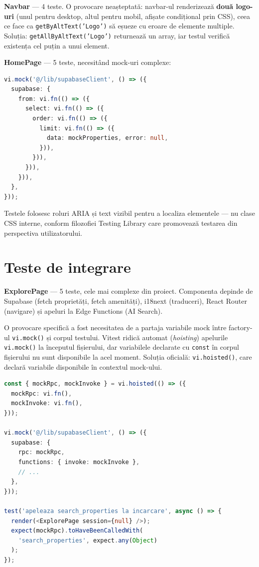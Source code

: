 \documentclass[12pt,a4paper,oneside]{report}
\begin{document}
\textbf{Navbar} — 4 teste. O provocare neașteptată: navbar-ul renderizează \textbf{două logo-uri} (unul pentru desktop, altul pentru mobil, afișate condițional prin CSS), ceea ce face ca \texttt{getByAltText('Logo')} să eșueze cu eroare de elemente multiple. Soluția: \texttt{getAllByAltText('Logo')} returnează un array, iar testul verifică existența cel puțin a unui element.

\textbf{HomePage} — 5 teste, necesitând mock-uri complexe:

\begin{lstlisting}[language=TypeScript, caption={Exemplu de mock pentru Supabase în teste}]
vi.mock('@/lib/supabaseClient', () => ({
  supabase: {
    from: vi.fn(() => ({
      select: vi.fn(() => ({
        order: vi.fn(() => ({
          limit: vi.fn(() => ({
            data: mockProperties, error: null,
          })),
        })),
      })),
    })),
  },
}));
\end{lstlisting}

Testele folosesc roluri ARIA și text vizibil pentru a localiza elementele — nu clase CSS interne, conform filozofiei Testing Library care promovează testarea din perspectiva utilizatorului.


\section{Teste de integrare}

\textbf{ExplorePage} — 5 teste, cele mai complexe din proiect. Componenta depinde de Supabase (fetch proprietăți, fetch amenități), i18next (traduceri), React Router (navigare) și apeluri la Edge Functions (AI Search).

O provocare specifică a fost necesitatea de a partaja variabile mock între factory-ul \texttt{vi.mock()} și corpul testului. Vitest ridică automat (\textit{hoisting}) apelurile \texttt{vi.mock()} la începutul fișierului, dar variabilele declarate cu \texttt{const} în corpul fișierului nu sunt disponibile la acel moment. Soluția oficială: \texttt{vi.hoisted()}, care declară variabile disponibile în contextul mock-ului.

\begin{lstlisting}[language=TypeScript, caption={Utilizarea vi.hoisted() pentru variabile mock partajate}]
const { mockRpc, mockInvoke } = vi.hoisted(() => ({
  mockRpc: vi.fn(),
  mockInvoke: vi.fn(),
}));

vi.mock('@/lib/supabaseClient', () => ({
  supabase: {
    rpc: mockRpc,
    functions: { invoke: mockInvoke },
    // ...
  },
}));

test('apeleaza search_properties la incarcare', async () => {
  render(<ExplorePage session={null} />);
  expect(mockRpc).toHaveBeenCalledWith(
    'search_properties', expect.any(Object)
  );
});
\end{lstlisting}
\end{document}
